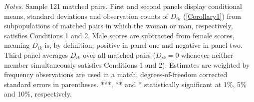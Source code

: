 \begin{table}
\begin{threeparttable}
\begin{tabular}{p{3cm}S[table-format=3.3]@{}S[table-format=3.3]@{}S[table-format=3.2]@{}S[table-format=4.3]@{}S[table-format=3.3]@{}S[table-format=3.1]@{}S@{}}
            \bottomrule
        \end{tabular}
        \begin{tablenotes}
            \tiny
            \item \textit{Notes}. Sample 121 matched pairs. First and second panels display conditional means, standard deviations and observation counts of \(D_{ik}\) (\autoref{Corollary1}) from subpopulations of matched pairs in which the woman or man, respectively, satisfies Conditions 1 and 2. Male scores are subtracted from female scores, meaning \(D_{ik}\) is, by definition, positive in panel one and negative in panel two. Third panel averages \(D_{ik}\) over all matched pairs (\(D_{ik}=0\) whenever neither member simultaneously satisfies Conditions 1 and 2). Estimates are weighted by frequency observations are used in a match; degrees-of-freedom corrected standard errors in parentheses. ***, ** and * statistically significant at 1\%, 5\% and 10\%, respectively.
        \end{tablenotes}
    \end{threeparttable}
\end{table}